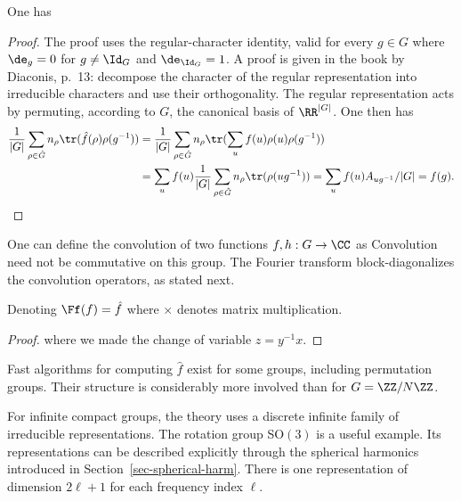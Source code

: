 \begin{prop}
One has
\end{prop}
\begin{proof}
The proof uses the regular-character identity, valid for every $g\in G$
where $\de_g=0$ for $g \neq \Id_G$ and $\de_{\Id_G}=1$. A proof is given in the book by Diaconis, p.~13: decompose the character of the regular representation into irreducible characters and use their orthogonality. The regular representation acts by permuting, according to $G$, the canonical basis of $\RR^{|G|}$.
%
One then has 
\begin{align*}
	\frac{1}{|G|} \sum_{\rho \in \hat G} n_\rho \tr( \hat f(\rho) \rho(g^{-1}) ) 
	&=  \frac{1}{|G|} \sum_{\rho \in \hat G} n_\rho \tr( \sum_u f(u) \rho(u) \rho(g^{-1}) ) \\
	&=  \sum_u  f(u) \frac{1}{|G|}  \sum_{\rho \in \hat G} n_\rho \tr( \rho(u g^{-1}) )
	=  \sum_u f(u)A_{ug^{-1}}/|G| = f(g).
\end{align*}
\end{proof}

One can define the convolution of two functions $f,h : G \rightarrow \CC$ as
Convolution need not be commutative on this group. The Fourier transform block-diagonalizes the convolution operators, as stated next.

\begin{prop}
Denoting $\Ff(f) = \hat f$
where $\times$ denotes matrix multiplication.
\end{prop}
\begin{proof}
where we made the change of variable $z=y^{-1}x$.
\end{proof}


Fast algorithms for computing $\hat f$ exist for some groups, including permutation groups. Their structure is considerably more involved than for $G=\ZZ/N\ZZ$.

For infinite compact groups, the theory uses a discrete infinite family of irreducible representations. The rotation group SO$(3)$ is a useful example. Its representations can be described explicitly through the spherical harmonics introduced in Section~\ref{sec-spherical-harm}. There is one representation of dimension $2\ell+1$ for each frequency index $\ell$.
 
